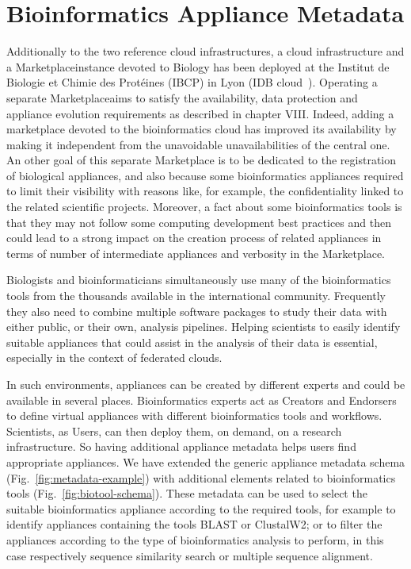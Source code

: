 \section{Bioinformatics Appliance Metadata}
\label{sec:bioinfo}

Additionally to the two reference cloud infrastructures, a cloud infrastructure and a Marketplace\@ instance devoted to Biology has been deployed at the
Institut de Biologie et Chimie des Prot\'eines (IBCP) in Lyon (IDB
cloud~\cite{idbcloud}). Operating a separate Marketplace\@ aims to satisfy the availability, data protection and appliance evolution requirements as described in chapter VIII. Indeed, adding a marketplace devoted to the bioinformatics cloud has improved its availability by making it independent from the unavoidable unavailabilities of the central one. An other goal of this separate Marketplace is to be dedicated to the registration of biological appliances, and also because some bioinformatics appliances required to limit their visibility with reasons like, for example, the confidentiality linked to the related scientific projects. Moreover, a fact about some bioinformatics tools is that they may not follow some computing development best practices and then could lead to a strong impact on the creation process of related appliances in terms of number of intermediate appliances and verbosity in the Marketplace\@. 

Biologists and bioinformaticians simultaneously use many of the
bioinformatics tools from the thousands available in the international
community. Frequently they also need to combine multiple software
packages to study their data with either public, or their own,
analysis pipelines. Helping scientists to easily identify suitable appliances
that could assist in the analysis of their data is essential,
especially in the context of federated clouds. 

In such environments, appliances can be created by different experts and could be available
in several places. Bioinformatics experts act as Creators and Endorsers to define virtual
appliances with different bioinformatics tools and workflows. Scientists, as Users, can
then deploy them, on demand, on a research infrastructure. So having additional appliance metadata helps users
find appropriate appliances. We have extended the generic appliance metadata schema (Fig.~\ref{fig:metadata-example})
with additional elements related to bioinformatics tools (Fig.~\ref{fig:biotool-schema}). These metadata can be used to select the
suitable bioinformatics appliance according to the required tools, for example to identify appliances containing the tools BLAST or ClustalW2; or to filter the appliances according to the type of bioinformatics analysis to perform, in this case respectively sequence similarity search or multiple sequence alignment.

